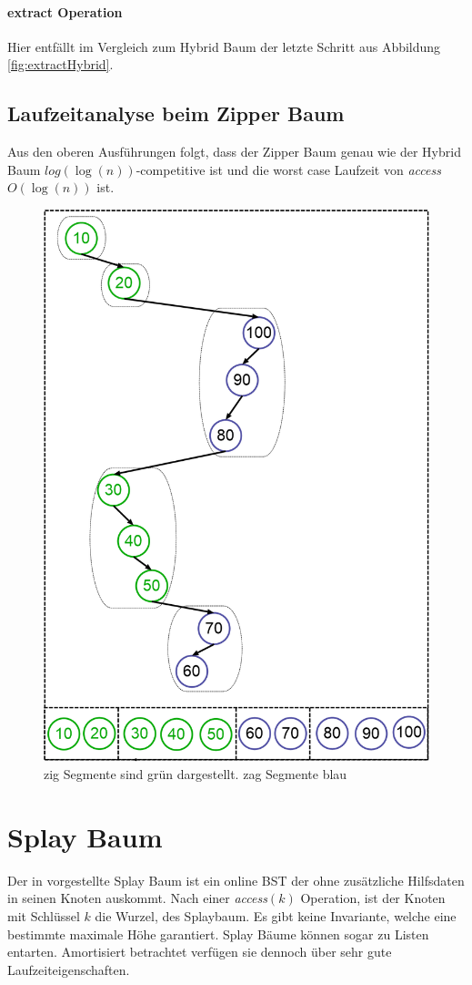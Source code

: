 \documentclass[a4paper,12pt]{article}
\begin{document}
\paragraph{extract Operation}
Hier entfällt im Vergleich zum Hybrid Baum der letzte Schritt aus Abbildung \ref{fig:extractHybrid}.\\


\subsection{Laufzeitanalyse beim Zipper Baum}
Aus den oberen Ausführungen folgt, dass der Zipper Baum genau wie der Hybrid Baum $log\left(\log\left(n\right)\right)$-competitive ist und die worst case Laufzeit von \textit{access} $O\left(\log\left(n\right)\right)$ ist.  

\begin{figure}[h]
	\centering
	\includegraphics[height= 0.7\textwidth]{"Medien/Zipper/preferredPathZigZag"}
	\caption{zig Segmente sind grün dargestellt. zag Segmente blau }
	\label{fig:preferredPathZigZag}
\end{figure}

\section{Splay Baum}
Der in \cite{splay} vorgestellte Splay Baum ist ein online BST der ohne zusätzliche Hilfsdaten in seinen Knoten auskommt. Nach einer \textit{access}$\left(k\right)$ Operation, ist der Knoten mit Schlüssel $k$ die Wurzel, des Splaybaum. Es gibt keine Invariante, welche eine bestimmte maximale Höhe garantiert. Splay Bäume können sogar zu Listen entarten. Amortisiert betrachtet verfügen sie dennoch über sehr gute Laufzeiteigenschaften. 
\end{document}
